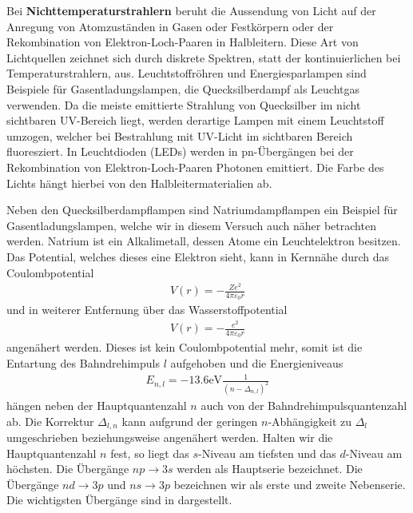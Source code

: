 Bei \textbf{Nichttemperaturstrahlern} beruht die Aussendung von Licht auf der Anregung von Atomzuständen in Gasen oder Festkörpern oder der Rekombination von Elektron-Loch-Paaren in Halbleitern. Diese Art von Lichtquellen zeichnet sich durch diskrete Spektren, statt der kontinuierlichen bei Temperaturstrahlern, aus. Leuchtstoffröhren und Energiesparlampen sind Beispiele für Gasentladungslampen, die Quecksilberdampf als Leuchtgas verwenden. Da die meiste emittierte Strahlung von Quecksilber im nicht sichtbaren UV-Bereich liegt, werden derartige Lampen mit einem Leuchtstoff umzogen, welcher bei Bestrahlung mit UV-Licht im sichtbaren Bereich fluoresziert. In Leuchtdioden (LEDs) werden in pn-Übergängen bei der Rekombination von Elektron-Loch-Paaren Photonen emittiert. Die Farbe des Lichts hängt hierbei von den Halbleitermaterialien ab.

Neben den Quecksilberdampflampen sind Natriumdampflampen ein Beispiel für Gasentladungslampen, welche wir in diesem Versuch auch näher betrachten werden. Natrium ist ein Alkalimetall, dessen Atome ein Leuchtelektron besitzen. Das Potential, welches dieses eine Elektron \glqq{}sieht\grqq{}, kann in Kernnähe durch das Coulombpotential
\begin{align}
  V(r) = -\frac{Ze^2}{4 \pi \varepsilon_0 r}
\end{align}
und in weiterer Entfernung über das Wasserstoffpotential
\begin{align}
  V(r) = -\frac{e^2}{4 \pi \varepsilon_0 r}
\end{align}
angenähert werden. Dieses ist kein Coulombpotential mehr, somit ist die Entartung des Bahndrehimpuls $l$ aufgehoben und die Energieniveaus 
\begin{align}
  E_{n,l} = -13.6\si{\electronvolt} \frac{1}{(n - \Delta_{n,l})^2}
\end{align}
hängen neben der Hauptquantenzahl $n$ auch von der Bahndrehimpulsquantenzahl ab. Die Korrektur $\Delta_{l,n}$ kann aufgrund der geringen $n$-Abhängigkeit zu $\Delta_{l}$ umgeschrieben beziehungsweise angenähert werden. Halten wir die Hauptquantenzahl $n$ fest, so liegt das $s$-Niveau am tiefsten und das $d$-Niveau am höchsten. Die Übergänge $np\to3s$ werden als Hauptserie bezeichnet. Die Übergänge $nd\to3p$ und $ns\to3p$ bezeichnen wir als erste und zweite Nebenserie. Die wichtigsten Übergänge sind in  dargestellt.

